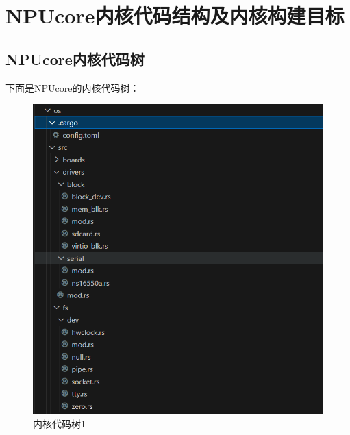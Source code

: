 \section{NPUcore内核代码结构及内核构建目标}
\subsection{NPUcore内核代码树}
下面是NPUcore的内核代码树：
\begin{figure}[htb]
	\centering
	\includegraphics[width=\textwidth]{figures/02-03-内核代码树1.png}
	\caption{
		内核代码树1
	}
	\label{fig:内核代码树1}
\end{figure}

